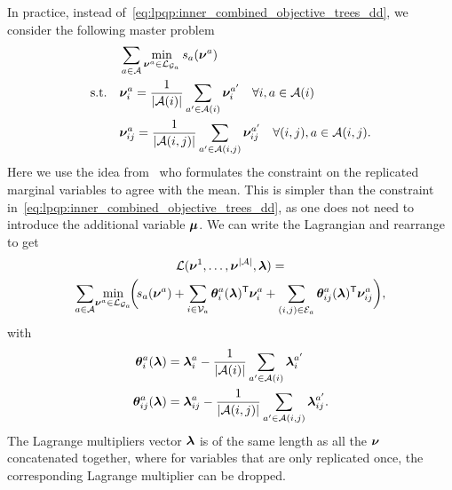 In practice, instead of~\eqref{eq:lpqp:inner_combined_objective_trees_dd}, we
consider the following master problem
\begin{align}
    \label{eq:lpqp:inner_trees_master}
    \quad &   \sum_{a \in \mathcal{A}} 
    \min_{\bm{\nu}^{a} \in
    \mathcal{L}_{\mathcal{G}_a}}
    s_{a}(\bm{\nu}^{a})\\
    \text{s.t.} \quad & \bm{\nu}^{a}_{i} = \frac{1}{|\mathcal{A}(i)|}
    \sum_{a' \in \mathcal{A}(i)} 
    \bm{\nu}^{a'}_{i} \quad \forall i, a \in \mathcal{A}(i)
    \notag \\
    \quad & \bm{\nu}^{a}_{ij} = \frac{1}{|\mathcal{A}(i,j)|}
    \sum_{a' \in \mathcal{A}(i,j)}
    \bm{\nu}^{a'}_{ij}\quad
    \forall (i,j),  a \in \mathcal{A}(i,j).\notag
\end{align}
Here we use the idea from~\parencite{Domke2011} who formulates the constraint on the
replicated marginal variables to agree with the mean. This is simpler than the constraint
in~\eqref{eq:lpqp:inner_combined_objective_trees_dd}, as one does not need to
introduce the additional variable $\bm{\mu}$.
We can write the Lagrangian and rearrange to get
\begin{multline*}
    \mathcal{L}(\bm{\nu}^{1},\ldots,\bm{\nu}^{|\mathcal{A}|},
    \bm{\lambda}) = \\
    \sum_{a \in \mathcal{A}} \!
    \min_{\bm{\nu}^{a} \in
    \mathcal{L}_{\mathcal{G}_a}} \!
    \biggl(\!
    s_{a}(\bm{\nu}^{a}) + 
    \sum_{i \in \mathcal{V}_a} \bm{\theta}_{i}^{a}(\bm{\lambda})^{\mathsf{T}}
    \bm{\nu}^{a}_{i} +
    \sum_{(i,j) \in \mathcal{E}_a}
    \bm{\theta}_{ij}^{a}(\bm{\lambda})^{\mathsf{T}}
    \bm{\nu}^{a}_{ij}
    \biggr),
\end{multline*}
with
\begin{align*}
    \bm{\theta}_{i}^{a}(\bm{\lambda}) &     =  \bm{\lambda}^{a}_{i} -
    \frac{1}{|\mathcal{A}(i)|} \sum_{a' \in \mathcal{A}(i)} \bm{\lambda}^{a'}_{i}\\
    \bm{\theta}_{ij}^{a}(\bm{\lambda}) &    =  \bm{\lambda}^{a}_{ij} -
    \frac{1}{|\mathcal{A}(i,j)|} \sum_{a' \in \mathcal{A}(i,j)} \bm{\lambda}^{a'}_{ij}.
\end{align*}
The Lagrange multipliers vector $\bm{\lambda}$ is of the same length as all the
$\bm{\nu}$ concatenated together,
 where for variables that are only
replicated once, the corresponding Lagrange multiplier can be dropped.
